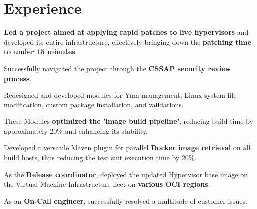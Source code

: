 \documentclass[]{resume-openfont}
\begin{document}
\begin{minipage}[t]{0.66\textwidth}


\section{Experience}
\vspace{\topsep} %
\begin{tightemize}
\item \textbf{Led a project aimed at applying rapid patches to live hypervisors} and developed its entire infrastructure, effectively bringing down the \textbf{patching time to under 15 minutes}.
\item Successfully navigated the project through the \textbf{CSSAP security review process}.
\item Redesigned and developed modules for Yum management, Linux system file modification, custom package installation, and validations.
\item These Modules \textbf{optimized the 'image build pipeline'}, reducing build time by approximately 20\% and enhancing its stability.
\item Developed a versatile Maven plugin for parallel \textbf{Docker image retrieval} on all build hosts, thus reducing the test suit execution time by 20\%.
\item As the \textbf{Release coordinator}, deployed the updated Hypervisor base image on the Virtual Machine Infrastructure fleet on \textbf{various OCI regions}.
\item As an \textbf{On-Call engineer}, successfully resolved a multitude of customer issues.
\end{tightemize}
\sectionsep


\end{minipage}
\end{document}
